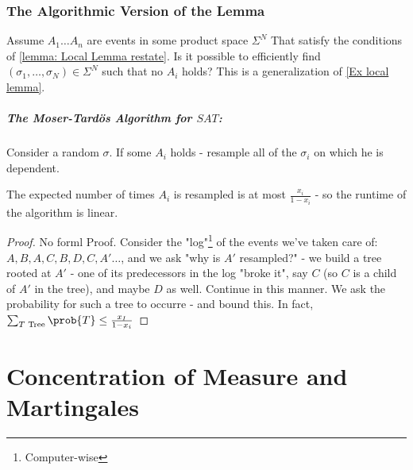 \documentclass[a4paper, 11pt, oneside]{book}
\begin{document}
	\subsection{The Algorithmic Version of the Lemma}
	Assume $A_1\ldots A_n$ are events in some product space $\Sigma^N$ That satisfy the conditions of \autoref{lemma: Local Lemma restate}. Is it possible to efficiently find $(\sigma_1,\ldots ,\sigma_N)\in \Sigma^N$ such that no $A_i$ holds? This is a generalization of \autoref{Ex local lemma}.
	\paragraph{The Moser-Tard\"os Algorithm for $SAT$:} Consider a  random $\sigma$. If some $A_i$ holds - resample all of the $\sigma_i$ on which he is dependent.
	\begin{claim}
		The expected number of times $A_i$ is resampled is at most $\frac{x_i}{1-x_i}$ - so the runtime of the algorithm is linear.
	\end{claim}
	\begin{proof}
		No forml Proof. Consider the "log"\footnote{Computer-wise} of the events we've taken care of: $A,B,A,C,B,D,C,A'\dots$, and we ask "why is $A'$ resampled?" - we build a tree rooted at $A'$ - one of its predecessors in the log "broke it", say $C$ (so $C$ is a child of $A'$ in the tree), and maybe $D$ as well. Continue in this manner. We ask the probability for such a tree to occurre - and bound this. In fact, $\sum_{T\text{ Tree}}\prob{T} \le \frac{x_I}{1-x_i}$
	\end{proof}
	\chapter{Concentration of Measure and Martingales}
\end{document}
